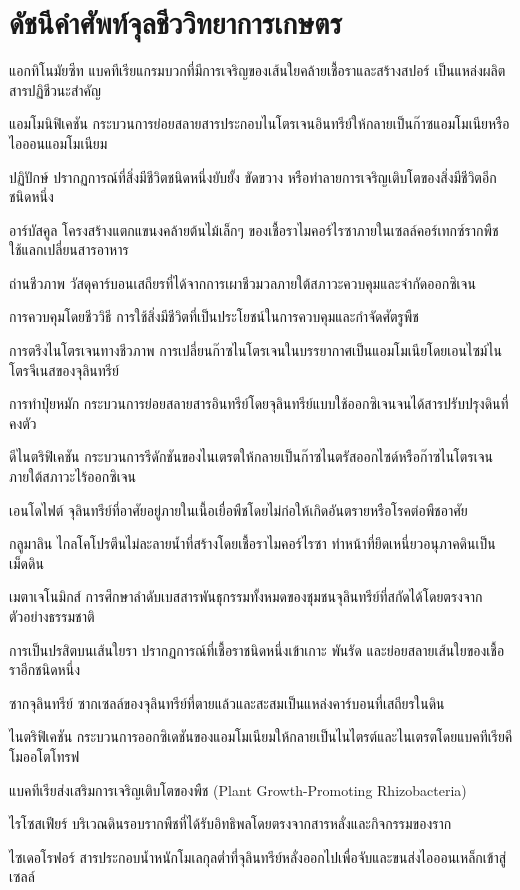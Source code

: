 \chapter{ดัชนีคำศัพท์จุลชีววิทยาการเกษตร}
\label{app:glossary}

\begin{description}[font=\bfseries\color{agriGreen}, leftmargin=4.5cm, style=nextline]
    \item[Actinomycetes] แอกทิโนมัยซีท แบคทีเรียแกรมบวกที่มีการเจริญของเส้นใยคล้ายเชื้อราและสร้างสปอร์ เป็นแหล่งผลิตสารปฏิชีวนะสำคัญ
    \item[Ammonification] แอมโมนิฟิเคชัน กระบวนการย่อยสลายสารประกอบไนโตรเจนอินทรีย์ให้กลายเป็นก๊าซแอมโมเนียหรือไอออนแอมโมเนียม
    \item[Antagonism] ปฏิปักษ์ ปรากฏการณ์ที่สิ่งมีชีวิตชนิดหนึ่งยับยั้ง ขัดขวาง หรือทำลายการเจริญเติบโตของสิ่งมีชีวิตอีกชนิดหนึ่ง
    \item[Arbuscule] อาร์บัสคูล โครงสร้างแตกแขนงคล้ายต้นไม้เล็กๆ ของเชื้อราไมคอร์ไรซาภายในเซลล์คอร์เทกซ์รากพืช ใช้แลกเปลี่ยนสารอาหาร
    \item[Biochar] ถ่านชีวภาพ วัสดุคาร์บอนเสถียรที่ได้จากการเผาชีวมวลภายใต้สภาวะควบคุมและจำกัดออกซิเจน
    \item[Biocontrol] การควบคุมโดยชีววิธี การใช้สิ่งมีชีวิตที่เป็นประโยชน์ในการควบคุมและกำจัดศัตรูพืช
    \item[Biological Nitrogen Fixation (BNF)] การตรึงไนโตรเจนทางชีวภาพ การเปลี่ยนก๊าซไนโตรเจนในบรรยากาศเป็นแอมโมเนียโดยเอนไซม์ไนโตรจีเนสของจุลินทรีย์
    \item[Composting] การทำปุ๋ยหมัก กระบวนการย่อยสลายสารอินทรีย์โดยจุลินทรีย์แบบใช้ออกซิเจนจนได้สารปรับปรุงดินที่คงตัว
    \item[Denitrification] ดีไนตริฟิเคชัน กระบวนการรีดักชันของไนเตรตให้กลายเป็นก๊าซไนตรัสออกไซด์หรือก๊าซไนโตรเจนภายใต้สภาวะไร้ออกซิเจน
    \item[Endophyte] เอนโดไฟต์ จุลินทรีย์ที่อาศัยอยู่ภายในเนื้อเยื่อพืชโดยไม่ก่อให้เกิดอันตรายหรือโรคต่อพืชอาศัย
    \item[Glomalin] กลูมาลิน ไกลโคโปรตีนไม่ละลายน้ำที่สร้างโดยเชื้อราไมคอร์ไรซา ทำหน้าที่ยึดเหนี่ยวอนุภาคดินเป็นเม็ดดิน
    \item[Metagenomics] เมตาเจโนมิกส์ การศึกษาลำดับเบสสารพันธุกรรมทั้งหมดของชุมชนจุลินทรีย์ที่สกัดได้โดยตรงจากตัวอย่างธรรมชาติ
    \item[Mycoparasitism] การเป็นปรสิตบนเส้นใยรา ปรากฏการณ์ที่เชื้อราชนิดหนึ่งเข้าเกาะ พันรัด และย่อยสลายเส้นใยของเชื้อราอีกชนิดหนึ่ง
    \item[Necromass] ซากจุลินทรีย์ ซากเซลล์ของจุลินทรีย์ที่ตายแล้วและสะสมเป็นแหล่งคาร์บอนที่เสถียรในดิน
    \item[Nitrification] ไนตริฟิเคชัน กระบวนการออกซิเดชันของแอมโมเนียมให้กลายเป็นไนไตรต์และไนเตรตโดยแบคทีเรียคีโมออโตโทรฟ
    \item[PGPR] แบคทีเรียส่งเสริมการเจริญเติบโตของพืช (Plant Growth-Promoting Rhizobacteria)
    \item[Rhizosphere] ไรโซสเฟียร์ บริเวณดินรอบรากพืชที่ได้รับอิทธิพลโดยตรงจากสารหลั่งและกิจกรรมของราก
    \item[Siderophore] ไซเดอโรฟอร์ สารประกอบน้ำหนักโมเลกุลต่ำที่จุลินทรีย์หลั่งออกไปเพื่อจับและขนส่งไอออนเหล็กเข้าสู่เซลล์
\end{description}

\clearpage